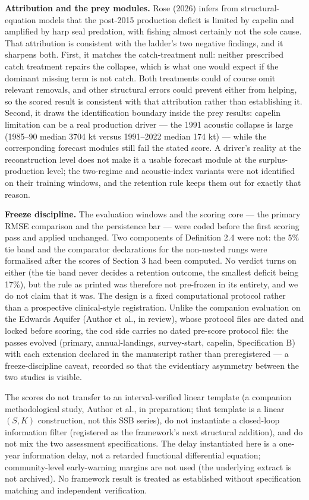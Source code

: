 \documentclass[11pt]{article}
\begin{document}
\textbf{Attribution and the prey modules.} Rose (2026) infers from
structural-equation models that the post-2015 production deficit is
limited by capelin and amplified by harp seal predation, with fishing
almost certainly not the sole cause. That attribution is consistent with
the ladder's two negative findings, and it sharpens both. First, it
matches the catch-treatment null: neither prescribed catch treatment
repairs the collapse, which is what one would expect if the dominant
missing term is not catch. Both treatments could of course omit relevant
removals, and other structural errors could prevent either from helping,
so the scored result is consistent with that attribution rather than
establishing it. Second, it draws the
identification boundary inside the prey results: capelin limitation can
be a real production driver --- the 1991 acoustic collapse is large
(1985--90 median 3704 kt versus 1991--2022 median 174 kt) --- while the
corresponding forecast modules still fail the stated score. A driver's
reality at the reconstruction level does not make it a usable forecast
module at the surplus-production level; the two-regime and
acoustic-index variants were not identified on their training windows,
and the retention rule keeps them out for exactly that reason.

\textbf{Freeze discipline.} The evaluation windows and the scoring core
--- the primary RMSE comparison and the persistence bar --- were coded
before the first scoring pass and applied unchanged. Two components of
Definition 2.4 were not: the 5\% tie band and the comparator
declarations for the non-nested rungs were formalised after the scores
of Section 3 had been computed. No verdict turns on either (the tie band
never decides a retention outcome, the smallest deficit being 17\%), but
the rule as printed was therefore not pre-frozen in its entirety, and we
do not claim that it was. The
design is a fixed computational protocol rather than a prospective
clinical-style registration. Unlike the companion evaluation on the
Edwards Aquifer (Author et al., in review), whose protocol files are
dated and locked before scoring, the cod side carries no dated pre-score
protocol file: the passes evolved (primary, annual-landings,
survey-start, capelin, Specification B) with each extension declared in
the manuscript rather than preregistered --- a freeze-discipline caveat,
recorded so that the evidentiary asymmetry between the two studies is
visible.

The scores do not transfer to an interval-verified linear template (a
companion methodological study, Author et al., in preparation; that
template is a linear \((S,K)\) construction, not this SSB series), do
not instantiate a closed-loop information filter (registered as the
framework's next structural addition), and do not mix the two assessment
specifications. The delay instantiated here is a one-year information
delay, not a retarded functional differential equation; community-level
early-warning margins are not used (the underlying extract is not
archived). No framework result is treated as established without
specification matching and independent verification.
\end{document}
